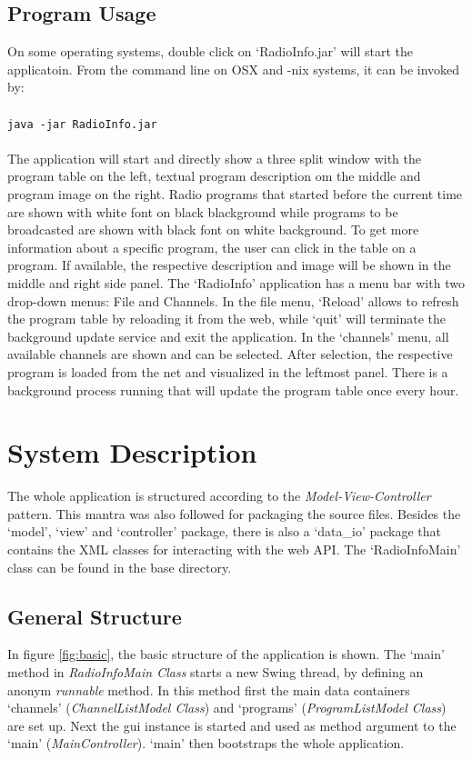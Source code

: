 \documentclass[a4paper,11pt,twoside]{article}
\begin{document}
\subsection{Program Usage}
On some operating systems, double click on `RadioInfo.jar' will start the applicatoin. From the command line on OSX and -nix systems, it can be invoked by: \\
\\
\verb+java -jar RadioInfo.jar+ \\
\\
The application will start and directly show a three split window with the program table on the left, textual program description om the middle and program image on the right.
Radio programs that started before the current time are shown with white font on black blackground while programs to be broadcasted are shown with black font on white background.
To get more information about a specific program, the user can click in the table on a program. If available, the respective description and image will be shown in the middle and right side panel.
The `RadioInfo' application has a menu bar with two drop-down menus: File and Channels. In the file menu, `Reload' allows to refresh the program table by reloading it from the web, while `quit' will terminate the background update service and exit the application. In the `channels' menu, all available channels are shown and can be selected. After selection, the respective program is loaded from the net and visualized in the leftmost panel.
There is a background process running that will update the program table once every hour. 


\section{System Description}
The whole application is structured according to the \textit{Model-View-Controller} pattern. This mantra was also followed for packaging the source files. Besides the `model', `view' and `controller' package, there is also a `data\_io' package that contains the XML classes for interacting with the web API. The `RadioInfoMain' class can be found in the base directory.  


\subsection{General Structure}
In figure \ref{fig:basic}, the basic structure of the application is shown. The `main' method in \textit{RadioInfoMain Class} starts a new Swing thread, by defining an anonym \textit{runnable} method. In this method first the main data containers `channels' (\textit{ChannelListModel Class}) and `programs' (\textit{ProgramListModel Class}) are set up. Next the gui instance is started and used as method argument to the `main' (\textit{MainController}). `main' then bootstraps the whole application. 
\end{document}
